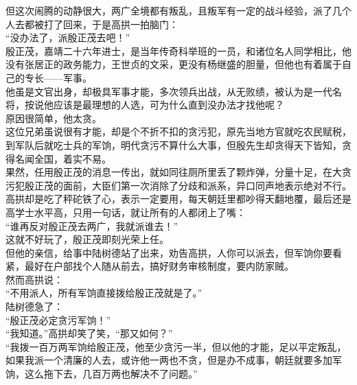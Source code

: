 \begin{multicols}{\theparacolNo}
但这次闹腾的动静很大，两广全境都有叛乱，且叛军有一定的战斗经验，派了几个人去都被打了回来，于是高拱一拍脑门：\\

“没办法了，派殷正茂去吧！”\\

殷正茂，嘉靖二十六年进士，是当年传奇科举班的一员，和诸位名人同学相比，他没有张居正的政务能力，王世贞的文采，更没有杨继盛的胆量，但他也有着属于自己的专长——军事。\\

他虽是文官出身，却极具军事才能，多次领兵出战，从无败绩，被认为是一代名将，按说他应该是最理想的人选，可为什么直到没办法才找他呢？\\

原因很简单，他太贪。\\

这位兄弟虽说很有才能，却是个不折不扣的贪污犯，原先当地方官就吃农民赋税，到军队后就吃士兵的军饷，明代贪污不算什么大事，但殷先生却贪得天下皆知，贪得名闻全国，着实不易。\\

果然，任用殷正茂的消息一传出，就如同往厕所里丢了颗炸弹，分量十足，在大贪污犯殷正茂的面前，大臣们第一次消除了分歧和派系，异口同声地表示绝对不行。\\

高拱却是吃了秤砣铁了心，表示一定要用，每天朝廷里都吵得天翻地覆，最后还是高学士水平高，只用一句话，就让所有的人都闭上了嘴：\\

“谁再反对殷正茂去两广，我就派谁去！”\\

这就不好玩了，殷正茂即刻光荣上任。\\

但他的亲信，给事中陆树德站了出来，劝告高拱，人你可以派去，但军饷你要看紧，最好在户部找个人随从前去，搞好财务审核制度，要内防家贼。\\

然而高拱说：\\

“不用派人，所有军饷直接拨给殷正茂就是了。”\\

陆树德急了：\\

“殷正茂必定贪污军饷！”\\

“我知道。”高拱却笑了笑，“那又如何？”\\

“我拨一百万两军饷给殷正茂，他至少贪污一半，但以他的才能，足以平定叛乱，如果我派一个清廉的人去，或许他一两也不贪，但是办不成事，朝廷就要多加军饷，这么拖下去，几百万两也解决不了问题。”\\


\end{multicols}

